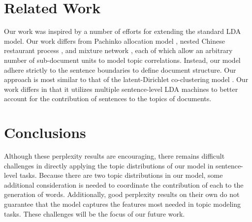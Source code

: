 % 

\section{Related Work} \label{s:related-work} 

Our work was inspired by a number of efforts for extending the standard LDA
model.  Our work differs from Pachinko allocation model \cite{li2006pachinko},
nested Chinese restaurant process \cite{blei2004hierarchical}, and mixture
network \cite{heinrich2009generic}, each of which allow an arbitrary number of
sub-document units to model topic correlations.  Instead, our model adhere
strictly to the sentence boundaries to define document structure.  Our approach
is most similar to that of the latent-Dirichlet co-clustering model
\cite{shafiei2006latent}.  Our work differs in that it utilizes multiple
sentence-level LDA machines to better account for the contribution of sentences
to the topics of documents.

\section{Conclusions} \label{s:discussion} 

Although these perplexity results are encouraging, there remains difficult
challenges in directly applying the topic distributions of our model in
sentence-level tasks.  Because there are two topic distributions in our model,
some additional consideration is needed to coordinate the contribution of each
to the generation of words.  Additionally, good perplexity results on their own
do not guarantee that the model captures the features most needed in topic
  modeling tasks.  These challenges will be the focus of our future work.

